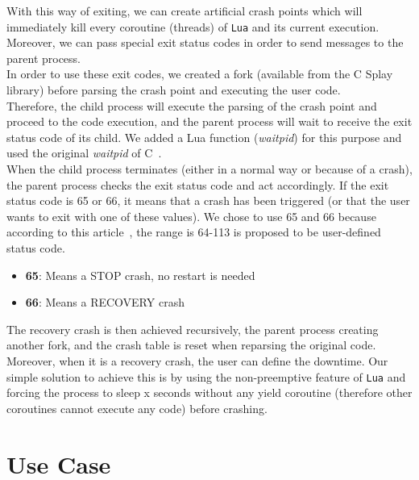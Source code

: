 \documentclass{eplmastersthesis}
\begin{document}
        With this way of exiting, we can create artificial crash points which
        will immediately kill every coroutine (threads) of \texttt{Lua} and its
        current execution. Moreover, we can pass special exit status codes
        in order to send messages to the parent process.\\
        In order to use these exit codes, we created a fork (available from
        the C Splay library) before parsing the crash point and executing
        the user code.\\
        Therefore, the child process will execute the parsing of the crash
        point and proceed to the code execution, and the parent process will
        wait to receive the exit status code of its child. We added a Lua
        function (\textit{waitpid}) for this purpose and used the original \textit{waitpid}
        of C~\cite{waitpid}.\\

        When the child process terminates (either in a normal way or because
        of a crash), the parent process checks the exit status code and act
        accordingly. If the exit status code is 65 or 66, it means that a
        crash has been triggered (or that the user wants to exit
        with one of these values). We chose to use 65 and 66 because
        according to this article~\cite{StatusCode}, the range is 64-113
        is proposed to be user-defined status code.

        \begin{itemize}
          \item \textbf{65}: Means a STOP crash, no restart is needed
          \item \textbf{66}: Means a RECOVERY crash
        \end{itemize}

        The recovery crash is then achieved recursively, the parent process
        creating another fork, and the crash table is reset when reparsing
        the original code. Moreover, when it is a recovery crash, the user
        can define the downtime. Our simple solution to achieve this is by
        using the non-preemptive feature of \texttt{Lua} and forcing the process
        to sleep x seconds without any yield coroutine (therefore other
        coroutines cannot execute any code) before crashing.

  \chapter{Use Case}
  \label{chap:usercase}
\end{document}
